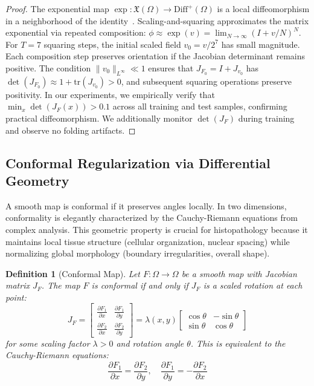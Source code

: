 \documentclass[final,3p,times,review,sort&compress]{elsarticle}
\newtheorem{definition}{Definition}
\begin{document}
\begin{proof}
The exponential map $\exp: \mathfrak{X}(\Omega) \rightarrow \text{Diff}^+(\Omega)$ is a local diffeomorphism in a neighborhood of the identity~\cite{arsigny2006logdiff}. Scaling-and-squaring approximates the matrix exponential via repeated composition: $\phi \approx \exp(v) = \lim_{N \rightarrow \infty} (I + v/N)^N$. For $T=7$ squaring steps, the initial scaled field $v_0 = v/2^7$ has small magnitude. Each composition step preserves orientation if the Jacobian determinant remains positive. The condition $\|v_0\|_{L^\infty} \ll 1$ ensures that $J_{F_0} = I + J_{v_0}$ has $\det(J_{F_0}) \approx 1 + \text{tr}(J_{v_0}) > 0$, and subsequent squaring operations preserve positivity. In our experiments, we empirically verify that $\min_x \det(J_F(x)) > 0.1$ across all training and test samples, confirming practical diffeomorphism. We additionally monitor $\det(J_F)$ during training and observe no folding artifacts.
\end{proof}

\subsection{Conformal Regularization via Differential Geometry}

A smooth map is conformal if it preserves angles locally. In two dimensions, conformality is elegantly characterized by the Cauchy-Riemann equations from complex analysis. This geometric property is crucial for histopathology because it maintains local tissue structure (cellular organization, nuclear spacing) while normalizing global morphology (boundary irregularities, overall shape).

\begin{definition}[Conformal Map]
\label{def:conformal}
Let $F: \Omega \rightarrow \Omega$ be a smooth map with Jacobian matrix $J_F$. The map $F$ is conformal if and only if $J_F$ is a scaled rotation at each point:
\begin{equation}
J_F = \begin{bmatrix} \frac{\partial F_1}{\partial x} & \frac{\partial F_1}{\partial y} \\ \frac{\partial F_2}{\partial x} & \frac{\partial F_2}{\partial y} \end{bmatrix} = \lambda(x,y) \begin{bmatrix} \cos\theta & -\sin\theta \\ \sin\theta & \cos\theta \end{bmatrix}
\end{equation}
for some scaling factor $\lambda > 0$ and rotation angle $\theta$. This is equivalent to the Cauchy-Riemann equations:
\begin{equation}
\frac{\partial F_1}{\partial x} = \frac{\partial F_2}{\partial y}, \quad \frac{\partial F_1}{\partial y} = -\frac{\partial F_2}{\partial x}
\label{eq:cauchy_riemann}
\end{equation}
\end{definition}
\end{document}
